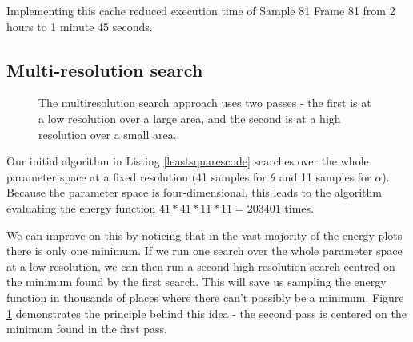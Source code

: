 Implementing this cache reduced execution time of Sample 81 Frame 81 from 2 hours to 1 minute 45 seconds.

\subsection{Multi-resolution search}
\label{Design:MultiRes}

\begin{figure}[tb]
	\centering
	\qquad
	\caption{The multiresolution search approach uses two passes - the first is at a low resolution over a large area,
		and the second is at a high resolution over a small area.}
	\label{MultiResImages}
\end{figure}

Our initial algorithm in Listing \ref{leastsquarescode} searches over the whole parameter space at a fixed resolution (41 samples for $\theta$ and 11 samples for $\alpha$).
Because the parameter space is four-dimensional, this leads to the algorithm evaluating the energy function $41*41*11*11 = 203401$ times.

We can improve on this by noticing that in the vast majority of the energy plots there is only one minimum.
If we run one search over the whole parameter space at a low resolution, we can then run a second high resolution search centred on the minimum found by the first search.
This will save us sampling the energy function in thousands of places where there can't possibly be a minimum.
Figure \ref{MultiResImages} demonstrates the principle behind this idea - the second pass is centered on the minimum found in the first pass.

